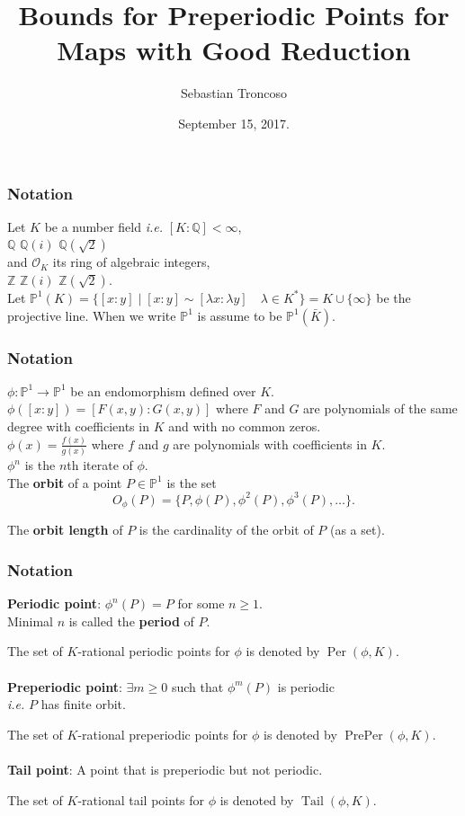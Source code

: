 \documentclass{beamer}
\title[Bounds for Preperiodic Points]{Bounds for Preperiodic Points for Maps with Good Reduction}
\author[S. Troncoso]{Sebastian Troncoso}
\institute[BSC]{Birmingham-Southern College}
\date[September 15, 2017.]{ September 15, 2017. \\ \vspace{1cm} }
\def\jump{ \quad \\ \vspace{0.7cm} \pause}
\def\PP{{\mathbb P}}
\DeclareMathOperator{\Tail}{Tail}
\DeclareMathOperator{\Per}{Per}
\DeclareMathOperator{\PrePer}{PrePer}
\theoremstyle{thmstyle}
\theoremstyle{thmstyle}
\theoremstyle{mystyle}
\theoremstyle{qstnstyle}
\begin{document}
\begin{frame}
\titlepage
\end{frame}

\begin{frame}
\frametitle{Notation}
Let $K$ be a number field \emph{i.e.} $[K: \mathbb{Q}] < \infty$,   
\jump
$\mathbb{Q}$ \quad $\mathbb{Q}(i)$ \quad $\mathbb{Q}(\sqrt{2})$ 
\jump
and $\mathcal{O}_K$ its ring of algebraic integers,
\jump
$\mathbb{Z}$ \quad $\mathbb{Z}(i)$ \quad $\mathbb{Z}(\sqrt{2}).$ 
\jump
Let $\displaystyle \mathbb{P}^1(K)=\{[x:y] \mid  [x:y]\sim [\lambda x:\lambda y] \quad \lambda\in K^{*} \} = K\cup \{\infty \}$ be  the projective line. \pause When we write $\PP^1$ is assume to be $\PP^1(\bar{K})$.

\end{frame}

\begin{frame}
\frametitle{Notation}
$\phi:\mathbb{P}^1\to\mathbb{P}^1$ be an endomorphism defined over $K$.
\jump
$\phi([x:y])=[F(x,y):G(x,y)]$ where $F$ and $G$ are polynomials of the same degree with coefficients in $K$ and with no common zeros.
\jump
$\displaystyle\phi(x)=\frac{f(x)}{g(x)}$ where $f$ and $g$ are polynomials with coefficients in $K$.
\jump
$\phi^n$ is the $n$th iterate of $\phi$.
\\ \pause
The \textbf{orbit} of a point $P\in\PP^1$ is the set 
$$ O_{\phi}(P) = \{P, \phi(P),\phi^2(P),\phi^3(P),\ldots \}.$$

\pause The \textbf{orbit length} of $P$ is the cardinality of the orbit of $P$ (as a set).
\end{frame}

\begin{frame}
\frametitle{Notation}

\textbf{Periodic point}: $\phi^n(P)=P$ for some $n\geq{1}$.
\\\quad\quad \pause Minimal $n$ is called the \textbf{period} of $P$.

\pause
\vspace{2mm}
The set of $K$-rational periodic points for $\phi$ is denoted by $\Per(\phi,K)$.
\\\quad\\
\pause
\textbf{Preperiodic point}: $\exists m\geq{0}$ such that $\phi^m(P)$
is periodic \\\quad\quad \pause \emph{i.e.}  $P$ has finite orbit.

\pause
\vspace{2mm}
The set of $K$-rational preperiodic points for $\phi$ is denoted by $\PrePer(\phi,K)$.
\\\quad\\
\pause
\textbf{Tail point}: A point that is preperiodic but not periodic.

\pause
\vspace{2mm}
The set of $K$-rational tail points for $\phi$ is denoted by $\Tail(\phi,K)$.
\end{frame}
\end{document}
